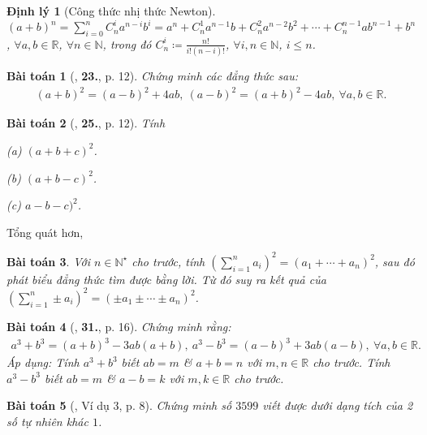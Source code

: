 \documentclass{article}
\numberwithin{equation}{section}
\newtheorem{baitoan}{Bài toán}[section]
\newtheorem{dinhly}{Định lý}[section]
\begin{document}
\begin{dinhly}[Công thức nhị thức Newton]
	$(a + b)^n = \sum_{i=0}^n C_n^ia^{n-i}b^i = a^n + C_n^1a^{n-1}b + C_n^2a^{n-2}b^2 + \cdots + C_n^{n-1}ab^{n-1} + b^n$, $\forall a,b\in\mathbb{R}$, $\forall n\in\mathbb{N}$, trong đó $C_n^i\coloneqq\frac{n!}{i!(n - i)!}$, $\forall i,n\in\mathbb{N}$, $i\le n$.
\end{dinhly}


\begin{baitoan}[\cite{SGK_Toan_8_tap_1}, \textbf{23.}, p. 12]
	Chứng minh các đẳng thức sau:
	\begin{align*}
		(a + b)^2 = (a - b)^2 + 4ab,\ (a - b)^2 = (a + b)^2 - 4ab,\ \forall a,b\in\mathbb{R}.
	\end{align*}
\end{baitoan}

\begin{baitoan}[\cite{SGK_Toan_8_tap_1}, \textbf{25.}, p. 12]
	Tính
	\begin{enumerate*}
		\item[(a)] $(a + b + c)^2$.
		\item[(b)] $(a + b - c)^2$.
		\item[(c)] $a - b - c)^2$.
	\end{enumerate*}
\end{baitoan}
Tổng quát hơn,
\begin{baitoan}
	Với $n\in\mathbb{N}^\star$ cho trước, tính $\left(\sum_{i=1}^n a_i\right)^2 = (a_1 + \cdots + a_n)^2$, sau đó phát biểu đẳng thức tìm được bằng lời. Từ đó suy ra kết quả của $\left(\sum_{i=1}^n \pm a_i\right)^2 = (\pm a_1\pm\cdots\pm a_n)^2$.
\end{baitoan}

\begin{baitoan}[\cite{SGK_Toan_8_tap_1}, \textbf{31.}, p. 16]
	Chứng minh rằng:
	\begin{align*}
		a^3 + b^3 = (a + b)^3 - 3ab(a + b),\ a^3 - b^3 = (a - b)^3 + 3ab(a - b),\ \forall a,b\in\mathbb{R}.
	\end{align*}
	Áp dụng: Tính $a^3 + b^3$ biết $ab = m$ \& $a + b = n$ với $m,n\in\mathbb{R}$ cho trước. Tính $a^3 - b^3$ biết $ab = m$ \& $a - b = k$ với $m,k\in\mathbb{R}$ cho trước.
\end{baitoan}

\begin{baitoan}[\cite{Binh_Toan_8_tap_1}, Ví dụ 3, p. 8]
	Chứng minh số $3599$ viết được dưới dạng tích của 2 số tự nhiên khác $1$.
\end{baitoan}
\end{document}
